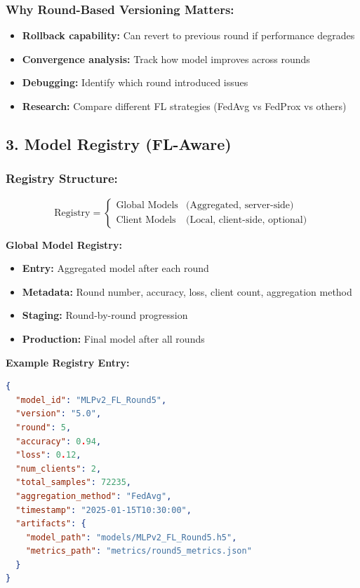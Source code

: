 \documentclass[12pt]{article}
\begin{document}
\subsubsection{Why Round-Based Versioning Matters:}

\begin{itemize}
    \item \textbf{Rollback capability:} Can revert to previous round if performance degrades
    \item \textbf{Convergence analysis:} Track how model improves across rounds
    \item \textbf{Debugging:} Identify which round introduced issues
    \item \textbf{Research:} Compare different FL strategies (FedAvg vs FedProx vs others)
\end{itemize}

\subsection{3. Model Registry (FL-Aware)}

\subsubsection{Registry Structure:}

\[
\text{Registry} = \begin{cases}
\text{Global Models} & \text{(Aggregated, server-side)} \\
\text{Client Models} & \text{(Local, client-side, optional)}
\end{cases}
\]

\textbf{Global Model Registry:}
\begin{itemize}
    \item \textbf{Entry:} Aggregated model after each round
    \item \textbf{Metadata:} Round number, accuracy, loss, client count, aggregation method
    \item \textbf{Staging:} Round-by-round progression
    \item \textbf{Production:} Final model after all rounds
\end{itemize}

\textbf{Example Registry Entry:}
\begin{lstlisting}[language=JSON]
{
  "model_id": "MLPv2_FL_Round5",
  "version": "5.0",
  "round": 5,
  "accuracy": 0.94,
  "loss": 0.12,
  "num_clients": 2,
  "total_samples": 72235,
  "aggregation_method": "FedAvg",
  "timestamp": "2025-01-15T10:30:00",
  "artifacts": {
    "model_path": "models/MLPv2_FL_Round5.h5",
    "metrics_path": "metrics/round5_metrics.json"
  }
}
\end{lstlisting}
\end{document}
